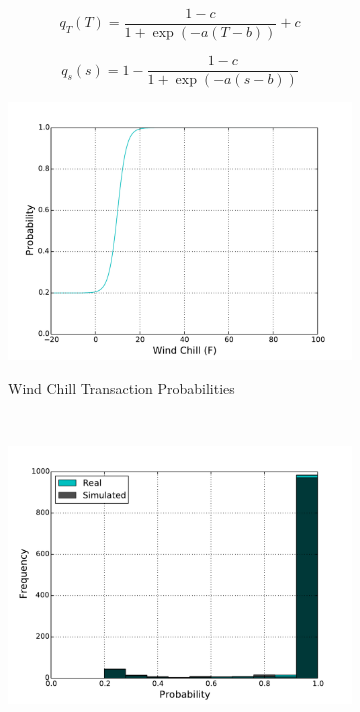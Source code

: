 \documentclass[11pt, letterpaper]{article}
\begin{document}
\begin{equation}
q_T(T) = \frac{1 - c}{1 + \exp(-a (T - b))} + c
\end{equation}

\begin{equation}
q_s(s) = 1 - \frac{1 - c}{1 + \exp(-a (s - b))}
\end{equation}



\begin{figure}[H]
  \centering
  \begin{subfigure}[b]{0.45\textwidth}
    \includegraphics[width=\textwidth]{figures/wind_chill_trans_prob.pdf}
    \label{fig:analysis-raw}
    \caption{Wind Chill Transaction Probabilities}
  \end{subfigure}
  ~
  \begin{subfigure}[b]{0.45\textwidth}
    \includegraphics[width=\textwidth]{figures/wind_chill_trans_prob_hist.pdf}

\end{subfigure}
\end{figure}
\end{document}
